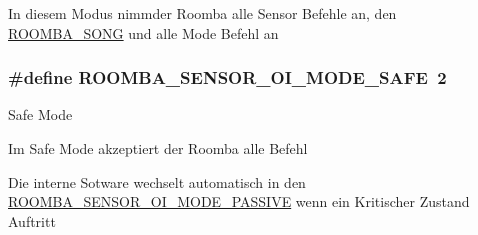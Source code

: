 In diesem Modus nimmder Roomba alle Sensor Befehle an, den \hyperlink{group__roomba__commands__motor_gade5b4a0d2f24f3f551bf43aedbf6e653}{R\-O\-O\-M\-B\-A\-\_\-\-S\-O\-N\-G} und alle Mode Befehl an \hypertarget{group__roomba__oi__modes_gac946396edec6f2dcdb9dff6d23453da4}{
\subsubsection[{R\-O\-O\-M\-B\-A\-\_\-\-S\-E\-N\-S\-O\-R\-\_\-\-O\-I\-\_\-\-M\-O\-D\-E\-\_\-\-S\-A\-F\-E}]{\setlength{\rightskip}{0pt plus 5cm}\#define R\-O\-O\-M\-B\-A\-\_\-\-S\-E\-N\-S\-O\-R\-\_\-\-O\-I\-\_\-\-M\-O\-D\-E\-\_\-\-S\-A\-F\-E~2}}\label{group__roomba__oi__modes_gac946396edec6f2dcdb9dff6d23453da4}
Safe Mode

Im Safe Mode akzeptiert der Roomba alle Befehl

Die interne Sotware wechselt automatisch in den \hyperlink{group__roomba__oi__modes_ga66261dece9fcb24410381451bde2c953}{R\-O\-O\-M\-B\-A\-\_\-\-S\-E\-N\-S\-O\-R\-\_\-\-O\-I\-\_\-\-M\-O\-D\-E\-\_\-\-P\-A\-S\-S\-I\-V\-E} wenn ein Kritischer Zustand Auftritt 